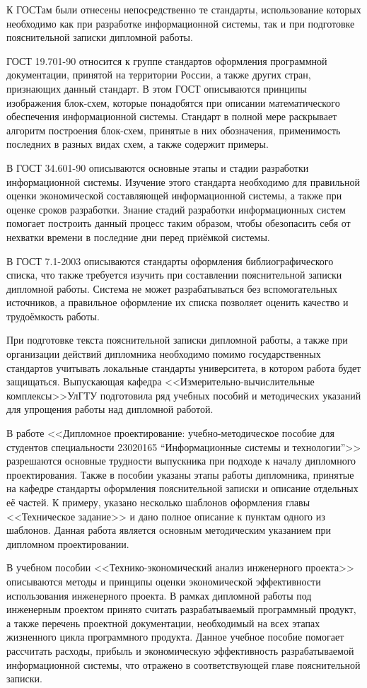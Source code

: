 К ГОСТам были отнесены непосредственно те стандарты, использование которых необходимо как при разработке информационной системы, так и при подготовке пояснительной записки дипломной работы.

ГОСТ 19.701-90 относится к группе стандартов оформления программной документации, принятой на территории России, а также других стран, признающих данный стандарт.
В этом ГОСТ описываются принципы изображения блок-схем, которые понадобятся при описании математического обеспечения информационной системы.
Стандарт в полной мере раскрывает алгоритм построения блок-схем, принятые в них обозначения, применимость последних в разных видах схем, а также содержит примеры.

В ГОСТ 34.601-90 описываются основные этапы и стадии разработки информационной системы.
Изучение этого стандарта необходимо для правильной оценки экономической составляющей информационной системы, а также при оценке сроков разработки.
Знание стадий разработки информационных систем помогает построить данный процесс таким образом, чтобы обезопасить себя от нехватки времени в последние дни перед приёмкой системы.

В ГОСТ 7.1-2003 описываются стандарты оформления библиографического списка, что также требуется изучить при составлении пояснительной записки дипломной работы.
Система не может разрабатываться без вспомогательных источников, а правильное оформление их списка позволяет оценить качество и трудоёмкость работы.

При подготовке текста пояснительной записки дипломной работы, а также при организации действий дипломника необходимо помимо государственных стандартов учитывать локальные стандарты университета, в котором работа будет защищаться.
Выпускающая кафедра <<Измерительно-вычислительные комплексы>>\linebreak УлГТУ подготовила ряд учебных пособий и методических указаний для упрощения работы над дипломной работой.

В работе <<Дипломное проектирование: учебно-методическое пособие для студентов специальности 23020165 “Информационные системы и технологии”>> разрешаются основные трудности выпускника при подходе к началу дипломного проектирования.
Также в пособии указаны этапы работы дипломника, принятые на кафедре стандарты оформления пояснительной записки и описание отдельных её частей.
К примеру, указано несколько шаблонов оформления главы <<Техническое задание>> и дано полное описание к пунктам одного из шаблонов. 
Данная работа является основным методическим указанием при дипломном проектировании.

В учебном пособии <<Технико-экономический анализ инженерного проекта>> описываются методы и принципы оценки экономической эффективности использования инженерного проекта.
В рамках дипломной работы под инженерным проектом принято считать разрабатываемый программный продукт, а также перечень проектной документации, необходимый на всех этапах жизненного цикла программного продукта.
Данное учебное пособие помогает рассчитать расходы, прибыль и экономическую эффективность разрабатываемой информационной системы, что отражено в соответствующей главе пояснительной записки.

\clearpage
\newpage